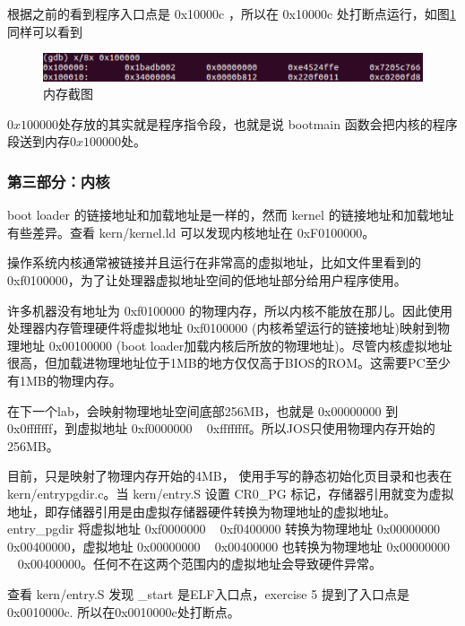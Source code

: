 \begin{ExerciseList}
根据之前的看到程序入口点是 0x10000c ，所以在 0x10000c 处打断点运行，如图\ref{fig:lab1:gdb_x2}同样可以看到

\begin{figure}[H]
  \centering
  \includegraphics[width=6in]{figures/lab1/gdb_x2.png}
  \caption{内存截图}\label{fig:lab1:gdb_x2}
\end{figure}

$0x100000$处存放的其实就是程序指令段，也就是说 bootmain 函数会把内核的程序段送到内存$0x100000$处。



\subsubsection{第三部分：内核}

boot loader 的链接地址和加载地址是一样的，然而 kernel 的链接地址和加载地址有些差异。查看 kern/kernel.ld 可以发现内核地址在 0xF0100000。

操作系统内核通常被链接并且运行在非常高的虚拟地址，比如文件里看到的 0xf0100000，为了让处理器虚拟地址空间的低地址部分给用户程序使用。

许多机器没有地址为 0xf0100000 的物理内存，所以内核不能放在那儿。因此使用处理器内存管理硬件将虚拟地址 0xf0100000 (内核希望运行的链接地址)映射到物理地址 0x00100000 (boot loader加载内核后所放的物理地址)。尽管内核虚拟地址很高，但加载进物理地址位于1MB的地方仅仅高于BIOS的ROM。这需要PC至少有1MB的物理内存。

在下一个lab，会映射物理地址空间底部256MB，也就是 0x00000000 到 0x0fffffff，到虚拟地址 0xf0000000 ~ 0xffffffff。所以JOS只使用物理内存开始的256MB。

目前，只是映射了物理内存开始的4MB， 使用手写的静态初始化页目录和也表在 kern/entrypgdir.c。当 kern/entry.S 设置 CR0\_PG 标记，存储器引用就变为虚拟地址，即存储器引用是由虚拟存储器硬件转换为物理地址的虚拟地址。entry\_pgdir 将虚拟地址 0xf0000000 ~ 0xf0400000 转换为物理地址 0x00000000 ~ 0x00400000，虚拟地址 0x00000000 ~ 0x00400000 也转换为物理地址 0x00000000 ~ 0x00400000。任何不在这两个范围内的虚拟地址会导致硬件异常。


查看 kern/entry.S 发现 \_start 是ELF入口点，exercise 5 提到了入口点是 0x0010000c. 所以在0x0010000c处打断点。


\end{ExerciseList}
